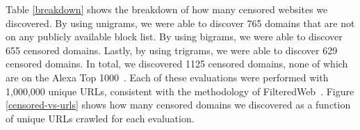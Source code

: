 \begin{table}[b]
  \begin{center}
  \end{center}
  \caption{\label{effective-unigrams}Sample of unigrams with
    significant blockrates}
\end{table}

Table \ref{breakdown} shows the breakdown of how many censored
websites we discovered. By using unigrams, we were able to discover
765 domains that are not on any publicly available block list. By
using bigrams, we were able to discover 655 censored domains. Lastly,
by using trigrams, we were able to discover 629 censored domains. In
total, we discovered 1125 censored domains, none of which are on the
Alexa Top 1000~\cite{alexa:top1000}. Each of these evaluations were
performed with 1,000,000 unique URLs, consistent with the methodology
of FilteredWeb~\cite{darer2017filteredweb}. Figure
\ref{censored-vs-urls} shows how many censored domains we discovered
as a function of unique URLs crawled for each evaluation.

